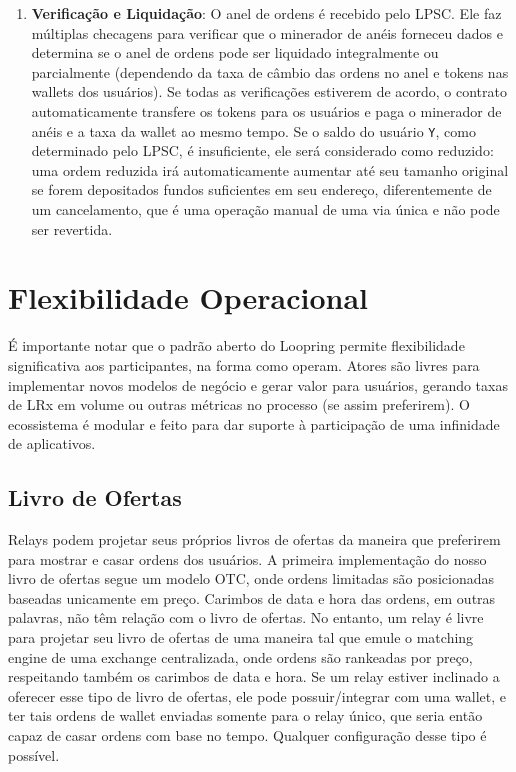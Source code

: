 \documentclass[UTF8,nofonts]{article}
\makeatletter
\newenvironment{figurehere}
 {\def\@captype{figure}}
 {}
\makeatother
\begin{document}
\begin{multicols}{2}
\begin{enumerate}
\item \textbf{Verificação e Liquidação}: O anel de ordens é recebido pelo LPSC. Ele faz múltiplas checagens para verificar que o minerador de anéis forneceu dados e determina se o anel de ordens pode ser liquidado integralmente ou parcialmente (dependendo da taxa de câmbio das ordens no anel e tokens nas wallets dos usuários). Se todas as verificações estiverem de acordo, o contrato automaticamente transfere os tokens para os usuários e paga o minerador de anéis e a taxa da wallet ao mesmo tempo. Se o saldo do usuário \verb|Y|, como determinado pelo LPSC, é insuficiente, ele será considerado como reduzido: uma ordem reduzida irá automaticamente aumentar até seu tamanho original se forem depositados fundos suficientes em seu endereço, diferentemente de um cancelamento, que é uma operação manual de uma via única e não pode ser revertida.

\end{enumerate}

%
%
%

\section{Flexibilidade Operacional\label{sec:business_model}}
É importante notar que o padrão aberto do Loopring permite flexibilidade significativa aos participantes, na forma como operam. Atores são livres para implementar novos modelos de negócio e gerar valor para usuários, gerando taxas de LRx em volume ou outras métricas no processo (se assim preferirem). O ecossistema é modular e feito para dar suporte à participação de uma infinidade de aplicativos.

\subsection{Livro de Ofertas\label{sec:order_book}}
Relays podem projetar seus próprios livros de ofertas da maneira que preferirem para mostrar e casar ordens dos usuários. A primeira implementação do nosso livro de ofertas segue um modelo OTC, onde ordens limitadas são posicionadas baseadas unicamente em preço. Carimbos de data e hora das ordens, em outras palavras, não têm relação com o livro de ofertas. No entanto, um relay é livre para projetar seu livro de ofertas de uma maneira tal que emule o matching engine de uma exchange centralizada, onde ordens são rankeadas por preço, respeitando também os carimbos de data e hora. Se um relay estiver inclinado a oferecer esse tipo de livro de ofertas, ele pode possuir/integrar com uma wallet, e ter tais ordens de wallet enviadas somente para o relay único, que seria então capaz de casar ordens com base no tempo. Qualquer configuração desse tipo é possível.
 

\end{multicols}
\end{document}
